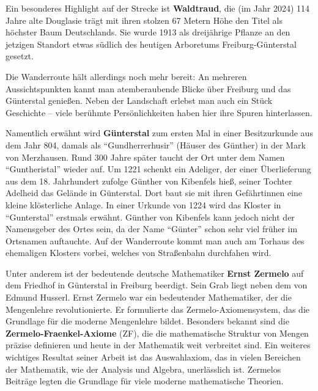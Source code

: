\documentclass[landscape, a4paper]{article}
\newcommand\alert[1]{\textcolor{PrimaryColor}{\textbf{#1}}}
\begin{document}
\begin{minipage}[t]{0.33\textwidth}
	Ein besonderes Highlight auf der Strecke ist \alert{Waldtraud}, die (im Jahr 2024) 114 Jahre alte Douglasie trägt mit ihren stolzen 67 Metern Höhe den Titel als höchster Baum Deutschlands. Sie wurde 1913 als dreijährige Pflanze an den jetzigen Standort etwas südlich des heutigen Arboretums Freiburg-Günterstal gesetzt.

	Die Wanderroute hält allerdings noch mehr bereit: An mehreren Aussichtspunkten kannt man atemberaubende Blicke über Freiburg und das Günterstal genießen. Neben der Landschaft erlebst man auch ein Stück Geschichte – viele berühmte Persönlichkeiten haben hier ihre Spuren hinterlassen.
\end{minipage}
\begin{minipage}[t]{0.33\textwidth}
	\setlength{\parskip}{0.25cm}

  Namentlich erwähnt wird \alert{Günterstal} zum ersten Mal in einer Besitzurkunde aus dem Jahr 804, damals als \enquote{Gundherrerhusir} (Häuser des Günther) in der Mark von Merzhausen. Rund 300 Jahre später taucht der Ort unter dem Namen \enquote{Guntheristal} wieder auf. Um 1221 schenkt ein Adeliger, der einer Überlieferung aus dem 18. Jahrhundert zufolge Günther von Kibenfels hieß, seiner Tochter Adelheid das Gelände in Günterstal. Dort baut sie mit ihren Gefährtinnen eine kleine klösterliche Anlage. In einer Urkunde von 1224 wird das Kloster in \enquote{Gunterstal} erstmals erwähnt. Günther von Kibenfels kann jedoch nicht der Namensgeber des Ortes sein, da der Name \enquote{Günter} schon sehr viel früher im Ortsnamen auftauchte. Auf der Wanderroute kommt man auch am Torhaus des ehemaligen Klosters vorbei, welches von Straßenbahn durchfahen wird.

	Unter anderem ist der bedeutende deutsche Mathematiker \alert{Ernst Zermelo} auf dem Friedhof in Günterstal in Freiburg beerdigt. Sein Grab liegt neben dem von Edmund Husserl. Ernst Zermelo war ein bedeutender Mathematiker, der die Mengenlehre revolutionierte. Er formulierte das Zermelo-Axiomensystem, das die Grundlage für die moderne Mengenlehre bildet. Besonders bekannt sind die \alert{Zermelo-Fraenkel-Axiome} (ZF), die die mathematische Struktur von Mengen präzise definieren und heute in der Mathematik weit verbreitet sind. Ein weiteres wichtiges Resultat seiner Arbeit ist das Auswahlaxiom, das in vielen Bereichen der Mathematik, wie der Analysis und Algebra, unerlässlich ist. Zermelos Beiträge legten die Grundlage für viele moderne mathematische Theorien.


\end{minipage}
\end{document}
